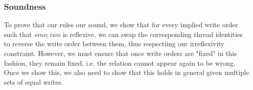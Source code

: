 
    \subsubsection{Soundness}

        To prove that our rules our sound, we show that for every implied write order such that $smo;iwo$ is reflexive, we can swap the corresponding thread identities to reverse the write order between them, thus respectiing our irreflexivity constraint. However, we must ensure that once write orders are "fixed" in this fashion, they remain fixed, i.e. the relation cannot appear again to be wrong. Once we show this, we also need to show that this holds in general given multiple sets of equal writes. 
        
